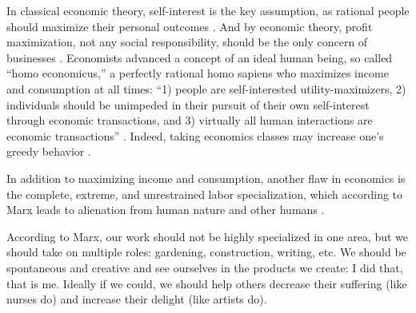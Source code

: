 \documentclass[10pt, letterpaper]{article}
\begin{document}
\begin{spacing}{1.8}
In classical economic theory, self-interest is the key assumption, as rational
people should maximize their personal outcomes \citep{seuntjens15b}. %
%
 And by economic theory, profit maximization, not any social responsibility, should be the only concern of businesses \citep{friedman70}.
Economists advanced a concept of an ideal human being, so called ``homo economicus,'' a perfectly rational homo sapiens who maximizes income and consumption at all times: %
``1) people are self-interested utility-maximizers, 2)
individuals should be unimpeded in their pursuit of their own self-interest
through economic transactions, and 3) virtually all human interactions are
economic transactions'' %
\citep[][p. 273]{walker1992greed}.
%
 Indeed, taking economics classes may increase one's greedy behavior \citep{wang11b}.

In addition to maximizing income and consumption, another flaw in economics
is the complete, extreme, and unrestrained labor specialization, which according to Marx leads to alienation from human nature
and other humans \citep{petrovic63}.

According to Marx, our work should not be highly specialized in one area, but we should take on
multiple roles: gardening, construction, writing, etc. We should be spontaneous and creative and see ourselves in the products we create: I did that, that is
me. %
Ideally if we could, we should help others decrease their suffering (like nurses do) and increase their delight (like artists do). 


\end{spacing}
\end{document}
